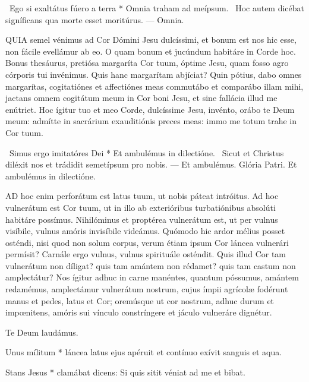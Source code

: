 \R\ Ego si exaltátus fúero a terra * Omnia traham ad meípsum. \V\ Hoc autem dicébat signíficans qua morte esset moritúrus. --- Omnia.



\lettrine[lines=2]{Q}{UIA} semel vénimus ad Cor Dómini Jesu dulcíssimi, et bonum est nos hic esse, non fácile evellámur ab eo. O quam bonum et jucúndum habitáre in Corde hoc. Bonus thesáurus, pretiósa margaríta Cor tuum, óptime Jesu, quam fosso agro córporis tui invénimus. Quis hanc margarítam abjíciat? Quin pótius, dabo omnes margarítas, cogitatiónes et affectiónes meas commutábo et comparábo illam mihi, jactans omnem cogitátum meum in Cor boni Jesu, et sine fallácia illud me enútriet. Hoc ígitur tuo et meo Corde, dulcíssime Jesu, invénto, orábo te Deum meum: admítte in sacrárium exauditiónis preces meas: immo me totum trahe in Cor tuum.

\R\ Simus ergo imitatóres Dei * Et ambulémus in dilectióne. \V\ Sicut et Christus diléxit nos et trádidit semetípsum pro nobis. --- Et ambulémus. Glória Patri. Et ambulémus in dilectióne.


\lettrine[lines=2]{A}{D} hoc enim perforátum est latus tuum, ut nobis páteat intróitus. Ad hoc vulnerátum est Cor tuum, ut in illo ab exterióribus turbatiónibus absolúti habitáre possímus. Nihilóminus et proptérea vulnerátum est, ut per vulnus visíbile, vulnus amóris invisíbile videámus. Quómodo hic ardor mélius posset osténdi, nisi quod non solum corpus, verum étiam ipsum Cor láncea vulnerári permísit? Carnále ergo vulnus, vulnus spirituále osténdit. Quis illud Cor tam vulnerátum non díligat? quis tam amántem non rédamet? quis tam castum non amplectátur? Nos ígitur adhuc in carne manéntes, quantum póssumus, amántem redamémus, amplectámur vulnerátum nostrum, cujus ímpii agrícolæ fodérunt manus et pedes, latus et Cor; oremúsque ut cor nostrum, adhuc durum et impœnitens, amóris sui vínculo constríngere et jáculo vulneráre dignétur.

Te Deum laudámus.



 Unus mílitum * láncea latus ejus apéruit et contínuo exívit sanguis et aqua.


 Stans Jesus * clamábat dicens: Si quis sitit véniat ad me et bibat.

